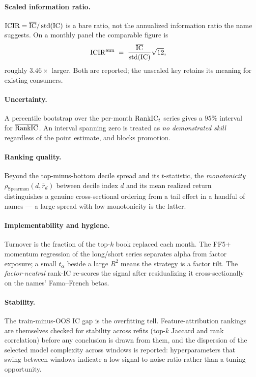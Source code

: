 \documentclass[11pt]{article}
\begin{document}
\paragraph{Scaled information ratio.}
$\mathrm{ICIR}=\overline{\mathrm{IC}}/\operatorname{std}(\mathrm{IC})$ is a bare ratio, not the annualized
information ratio the name suggests. On a monthly panel the comparable figure is
\begin{equation}
  \mathrm{ICIR}^{\text{ann}} \;=\; \frac{\overline{\mathrm{IC}}}{\operatorname{std}(\mathrm{IC})}\sqrt{12},
\end{equation}
roughly $3.46\times$ larger. Both are reported; the unscaled key retains its meaning
for existing consumers.

\paragraph{Uncertainty.}
A percentile bootstrap over the per-month $\mathrm{RankIC}_t$ series gives a $95\%$ interval
for $\overline{\mathrm{RankIC}}$. An interval spanning zero is treated as \emph{no
demonstrated skill} regardless of the point estimate, and blocks promotion.

\paragraph{Ranking quality.}
Beyond the top-minus-bottom decile spread and its $t$-statistic, the \emph{monotonicity}
$\rho_{\text{Spearman}}(d,\bar r_d)$ between decile index $d$ and its mean realized
return distinguishes a genuine cross-sectional ordering from a tail effect in a
handful of names --- a large spread with low monotonicity is the latter.

\paragraph{Implementability and hygiene.}
Turnover is the fraction of the top-$k$ book replaced each month. The FF5$+$momentum
regression of the long/short series separates alpha from factor exposure; a small
$t_\alpha$ beside a large $R^2$ means the strategy is a factor tilt. The
\emph{factor-neutral} rank-IC re-scores the signal after residualizing it
cross-sectionally on the names' Fama--French betas.

\paragraph{Stability.}
The train-minus-OOS IC gap is the overfitting tell. Feature-attribution rankings are
themselves checked for stability across refits (top-$k$ Jaccard and rank correlation)
before any conclusion is drawn from them, and the dispersion of the selected model
complexity across windows is reported: hyperparameters that swing between windows
indicate a low signal-to-noise ratio rather than a tuning opportunity.
\end{document}
